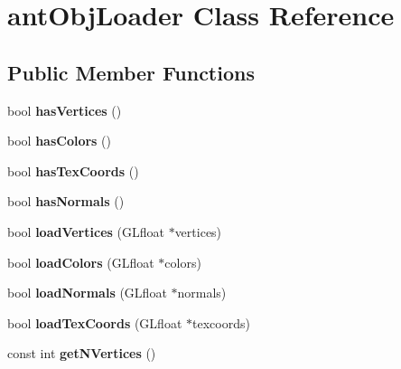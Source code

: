 \hypertarget{classant_obj_loader}{\section{ant\+Obj\+Loader Class Reference}
\label{classant_obj_loader}
}
\subsection*{Public Member Functions}
\begin{DoxyCompactItemize}
\item 
\hypertarget{classant_obj_loader_a25c1b247ff0625e7927d8d4ad28a84c9}{bool {\bfseries has\+Vertices} ()}\label{classant_obj_loader_a25c1b247ff0625e7927d8d4ad28a84c9}

\item 
\hypertarget{classant_obj_loader_a97da01dcb9d2de37cb5866d801b6214f}{bool {\bfseries has\+Colors} ()}\label{classant_obj_loader_a97da01dcb9d2de37cb5866d801b6214f}

\item 
\hypertarget{classant_obj_loader_a882972daf1a8feaa45955263d919bd34}{bool {\bfseries has\+Tex\+Coords} ()}\label{classant_obj_loader_a882972daf1a8feaa45955263d919bd34}

\item 
\hypertarget{classant_obj_loader_a6cddb0d03795cdf6e00f4628f13f7b5e}{bool {\bfseries has\+Normals} ()}\label{classant_obj_loader_a6cddb0d03795cdf6e00f4628f13f7b5e}

\item 
\hypertarget{classant_obj_loader_a9601e51f1ba4cc475877ae6e8634832e}{bool {\bfseries load\+Vertices} (G\+Lfloat $\ast$vertices)}\label{classant_obj_loader_a9601e51f1ba4cc475877ae6e8634832e}

\item 
\hypertarget{classant_obj_loader_aaace717cd031e4c5f13c6120f30a3588}{bool {\bfseries load\+Colors} (G\+Lfloat $\ast$colors)}\label{classant_obj_loader_aaace717cd031e4c5f13c6120f30a3588}

\item 
\hypertarget{classant_obj_loader_a55146e7322d4a1e4b212466d8e2d096d}{bool {\bfseries load\+Normals} (G\+Lfloat $\ast$normals)}\label{classant_obj_loader_a55146e7322d4a1e4b212466d8e2d096d}

\item 
\hypertarget{classant_obj_loader_adb7978c3f4262e608d2a0475d4a57d96}{bool {\bfseries load\+Tex\+Coords} (G\+Lfloat $\ast$texcoords)}\label{classant_obj_loader_adb7978c3f4262e608d2a0475d4a57d96}

\item 
\hypertarget{classant_obj_loader_a00404bc86b3aa9aaef44ea0b3a4fda9b}{const int {\bfseries get\+N\+Vertices} ()}\label{classant_obj_loader_a00404bc86b3aa9aaef44ea0b3a4fda9b}

\end{DoxyCompactItemize}
